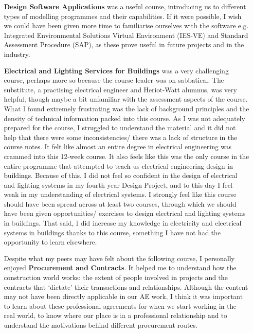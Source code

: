 \textbf{Design Software Applications} was a useful course, introducing us to different types of modelling programmes and their capabilities.
If it were possible, I wish we could have been given more time to familiarise ourselves with the software e.g. Integrated Environmental Solutions Virtual Environment (IES-VE) and Standard Assessment Procedure (SAP), as these prove useful in future projects and in the industry.

\textbf{Electrical and Lighting Services for Buildings} was a very challenging course, perhaps more so because the course leader was on sabbatical.
The substitute, a practising electrical engineer and Heriot-Watt alumnus, was very helpful, though maybe a bit unfamiliar with the assessment aspects of the course.
What I found extremely frustrating was the lack of background principles and the density of technical information packed into this course.
As I was not adequately prepared for the course, I struggled to understand the material and it did not help that there were some inconsistencies/ there was a lack of structure in the course notes.
It felt like almost an entire degree in electrical engineering was crammed into this 12-week course.
It also feels like this was the only course in the entire programme that attempted to teach us electrical engineering design in buildings.
Because of this, I did not feel so confident in the design of electrical and lighting systems in my fourth year Design Project, and to this day I feel weak in my understanding of electrical systems.
I strongly feel like this course should have been spread across at least two courses, through which we should have been given opportunities/ exercises to design electrical and lighting systems in buildings.
That said, I did increase my knowledge in electricity and electrical systems in buildings thanks to this course, something I have not had the opportunity to learn elsewhere.

Despite what my peers may have felt about the following course, I personally enjoyed \textbf{Procurement and Contracts}.
It helped me to understand how the construction world works: the extent of people involved in projects and the contracts that `dictate' their transactions and relationships.
Although the content may not have been directly applicable in our AE work, I think it was important to learn about these professional agreements for when we start working in the real world, to know where our place is in a professional relationship and to understand the motivations behind different procurement routes.

